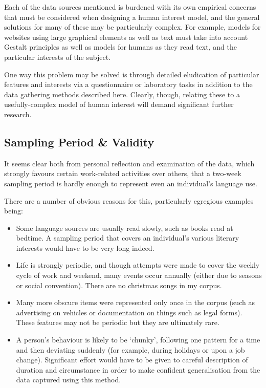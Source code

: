 Each of the data sources mentioned is burdened with its own empirical concerns that must be considered when designing a human interest model, and the general solutions for many of these may be particularly complex.  For example, models for websites using large graphical elements as well as text must take into account Gestalt principles as well as models for humans as they read text, and the particular interests of the subject.

One way this problem may be solved is through detailed eludication of particular features and interests via a questionnaire or laboratory tasks in addition to the data gathering methods described here.  Clearly, though, relating these to a usefully-complex model of human interest will demand significant further research.


\paragraph{}









\subsection{Sampling Period \& Validity}
It seems clear both from personal reflection and examination of the data, which strongly favours certain work-related activities over others, that a two-week sampling period is hardly enough to represent even an individual's language use.

There are a number of obvious reasons for this, particularly egregious examples being:

\begin{itemize}
    \item Some language sources are usually read slowly, such as books read at bedtime.  A sampling period that covers an individual's various literary interests would have to be very long indeed.
    \item Life is strongly periodic, and though attempts were made to cover the weekly cycle of work and weekend, many events occur annually (either due to seasons or social convention).  There are no christmas songs in my corpus.
    \item Many more obscure items were represented only once in the corpus (such as advertising on vehicles or documentation on things such as legal forms).  These features may not be periodic but they are ultimately rare.
    \item A person's behaviour is likely to be `chunky', following one pattern for a time and then deviating suddenly (for example, during holidays or upon a job change).  Significant effort would have to be given to careful description of duration and circumstance in order to make confident generalisation from the data captured using this method.
\end{itemize}

